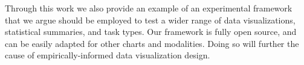 \documentclass[sigconf]{acmart}
\begin{document}
Through this work we also provide an example of an experimental
framework that we argue should be employed to test a wider range of data
visualizations, statistical summaries, and task types. Our framework is
fully open source, and can be easily adapted for other charts and
modalities. Doing so will further the cause of empirically-informed data
visualization design.




\end{document}
